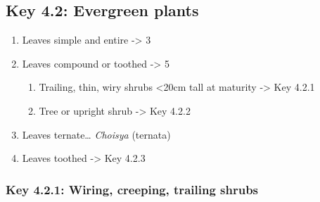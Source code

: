 \documentclass[openany]{book}
\providecommand{\tightlist}{%
  \setlength{\itemsep}{0pt}\setlength{\parskip}{0pt}}
\begin{document}
\hypertarget{key-4.2-evergreen-plants}{%
\subsection{Key 4.2: Evergreen plants}\label{key-4.2-evergreen-plants}}

\begin{enumerate}
\def\labelenumi{\arabic{enumi}.}
\tightlist
\item
  Leaves simple and entire -\textgreater{} 3
\item
  Leaves compound or toothed -\textgreater{} 5

  \begin{enumerate}
  \def\labelenumii{\arabic{enumii}.}
  \setcounter{enumii}{2}
  \tightlist
  \item
    Trailing, thin, wiry shrubs \textless{}20cm tall at maturity
    -\textgreater{} Key 4.2.1
  \item
    Tree or upright shrub -\textgreater{} Key 4.2.2
  \end{enumerate}
\item
  Leaves ternate\ldots{} \emph{Choisya} (ternata)
\item
  Leaves toothed -\textgreater{} Key 4.2.3
\end{enumerate}

\hypertarget{key-4.2.1-wiring-creeping-trailing-shrubs}{%
\subsubsection{Key 4.2.1: Wiring, creeping, trailing
shrubs}\label{key-4.2.1-wiring-creeping-trailing-shrubs}}
\end{document}
